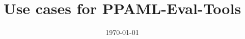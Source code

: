\documentclass[8pt,letterpaper]{article} %
\title{Use cases for PPAML-Eval-Tools}
\date{\today}
\begin{document}
\pagestyle{empty}
\clearpage%

\newcommand{\form}[1]{{\em #1}\xspace}
\def\ptk{\form{peval-toolkit}}
\def\cp{\form{challenge problem}}
\def\tev{\form{quantitative evaluator}}
\def\lev{\form{qualitative evaluator}}
\def\rep{\form{report}}
\def\ds{\form{data-set}}
\def\gs{\form{ground-truth}}
\def\ins{\form{instance}}
\def\sol{\form{solution}}
\def\gen{\form{generator}}
\def\out{\form{output}}
\def\tm{\form{team}}
\def\rn{\form{run}}
\def\eng{\form{engine}}
\def\t24{\form{TA2-4}}
\def\de{\form{domain expert}}
\def\desc{\form{INI File}}

\def\G{\form{Galois}}
\def\D{\form{DARPA}}
\def\U{\form{UNKNOWN}}
\end{document}
